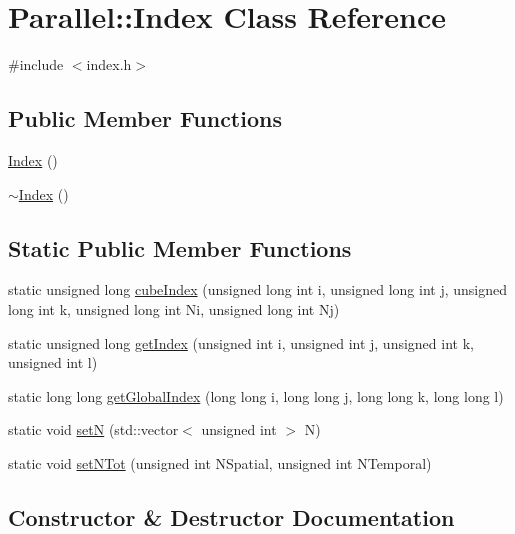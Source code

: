 \hypertarget{class_parallel_1_1_index}{}\section{Parallel\+::Index Class Reference}
\label{class_parallel_1_1_index}


{\ttfamily \#include $<$index.\+h$>$}

\subsection*{Public Member Functions}
\begin{DoxyCompactItemize}
\item 
\mbox{\hyperlink{class_parallel_1_1_index_a5fbbb71f34413a7e99b8d748dd81c317}{Index}} ()
\item 
\mbox{\hyperlink{class_parallel_1_1_index_a8818acaa30db0ee6c8a1270a99731f86}{$\sim$\+Index}} ()
\end{DoxyCompactItemize}
\subsection*{Static Public Member Functions}
\begin{DoxyCompactItemize}
\item 
static unsigned long \mbox{\hyperlink{class_parallel_1_1_index_ac406d7ceb12e986a66d64ef98fcef5d3}{cube\+Index}} (unsigned long int i, unsigned long int j, unsigned long int k, unsigned long int Ni, unsigned long int Nj)
\item 
static unsigned long \mbox{\hyperlink{class_parallel_1_1_index_af31faeef1369fdc0997d1910e008bfe2}{get\+Index}} (unsigned int i, unsigned int j, unsigned int k, unsigned int l)
\item 
static long long \mbox{\hyperlink{class_parallel_1_1_index_aaa2650024b4e91dc86d2bdc568c8f57d}{get\+Global\+Index}} (long long i, long long j, long long k, long long l)
\item 
static void \mbox{\hyperlink{class_parallel_1_1_index_ab8650936d7000d54b811dd128618f9ad}{setN}} (std\+::vector$<$ unsigned int $>$ N)
\item 
static void \mbox{\hyperlink{class_parallel_1_1_index_a14d1d30c926a76761ed1a1a51912a516}{set\+N\+Tot}} (unsigned int N\+Spatial, unsigned int N\+Temporal)
\end{DoxyCompactItemize}


\subsection{Constructor \& Destructor Documentation}
\mbox{\label{class_parallel_1_1_index_a5fbbb71f34413a7e99b8d748dd81c317}} 
